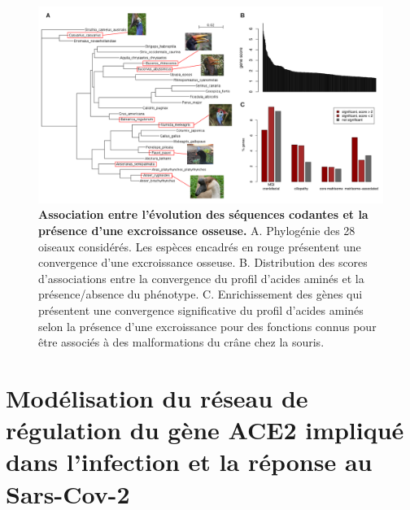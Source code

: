 \begin{figure}[h]
    \centering
    \includegraphics[width=1.2\textwidth, page=1] {figures/annexes/hocco-fig3.png}
    \caption[Association entre l'évolution des séquences codantes et la présence d'une excroissance osseuse.]{
    \textbf{Association entre l'évolution des séquences codantes et la présence d'une excroissance osseuse.}
    A. Phylogénie des 28 oiseaux considérés. Les espèces encadrés en rouge présentent une convergence d'une excroissance osseuse.
    B. Distribution des scores d'associations entre la convergence du profil d’acides aminés et la présence/absence du phénotype.
    C. Enrichissement des gènes qui présentent une convergence significative du profil d'acides aminés selon la présence d'une excroissance pour des fonctions connus pour être associés à des malformations du crâne chez la souris. \\
    }
    \label{fig:hocco-fig3}
\end{figure} 

\clearpage
\section{Modélisation du réseau de régulation du gène ACE2 impliqué dans l’infection et la réponse au Sars-Cov-2}
\label{annexe:ACE2}

